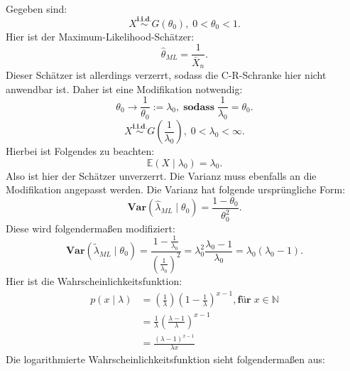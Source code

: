 \documentclass[10pt]{article}
\newcommand{\EW}{\mathbb{E}} %
\newcommand{\Var}{\textbf{Var}} %
\newenvironment{BSP}[1][]
{\begin{Beispiel}[frametitle=#1]}{\end{Beispiel}}
\begin{document}
	\begin{BSP}[Beispiel 1.4.3 (Anwendung C-R-Schranke Geometrische Verteilung)]
	Gegeben sind:
		\begin{equation*}
			X \overset{\textbf{i.i.d.}}{\sim} G(\theta_0), \; 0 < \theta_0 < 1.
		\end{equation*}
		Hier ist der Maximum-Likelihood-Schätzer:
		\begin{equation*}
			\hat{\theta}_{ML} = \frac{1}{\bar{X}_n}.
		\end{equation*}
		Dieser Schätzer ist allerdings verzerrt, sodass die C-R-Schranke hier nicht anwendbar ist. Daher ist eine Modifikation notwendig:
		\begin{equation*}
			\theta_0 \rightarrow \frac{1}{\theta_0} := \lambda_0, \; \textbf{sodass} \; \frac{1}{\lambda_0} = \theta_0.
		\end{equation*}
		\begin{equation*}
			X \overset{\textbf{i.i.d.}}{\sim} G(\frac{1}{\lambda_0}), \; 0 < \lambda_0 < \infty.
		\end{equation*}
		Hierbei ist Folgendes zu beachten:
		\begin{equation*}
			\EW (X \mid \lambda_0) = \lambda_0.
		\end{equation*}
		Also ist hier der Schätzer unverzerrt. Die Varianz muss ebenfalls an die Modifikation angepasst werden. Die Varianz hat folgende ursprüngliche Form:
		\begin{equation*}
			\Var(\hat{\lambda}_{ML} \mid \theta_0) = \frac{1 - \theta_0}{\theta^2_0}.
		\end{equation*}
		Diese wird folgendermaßen modifiziert:
		\begin{equation*}
			\Var(\tilde{\lambda}_{ML} \mid \theta_0) = \frac{1- \frac{1}{\lambda_0}}{\left(\frac{1}{\lambda_0}\right)^2} =\lambda^2_0 \frac{\lambda_0-1}{\lambda_0} = \lambda_0(\lambda_0-1). 
		\end{equation*}
		Hier ist die Wahrscheinlichkeitsfunktion:
		\begin{equation*}
			\begin{split}
				p(x\mid \lambda) &= \left(\frac{1}{\lambda}\right)\left(1- \frac{1}{\lambda}\right)^{x-1}, \textbf{für}\; x \in \mathbb{N}\\
				&= \frac{1}{\lambda}\left(\frac{\lambda-1}{\lambda}\right)^{x-1}\\
				&= \frac{(\lambda -1)^{x-1}}{\lambda x}
			\end{split}
		\end{equation*}
		Die logarithmierte Wahrscheinlichkeitsfunktion sieht folgendermaßen aus: 

\end{BSP}
\end{document}
